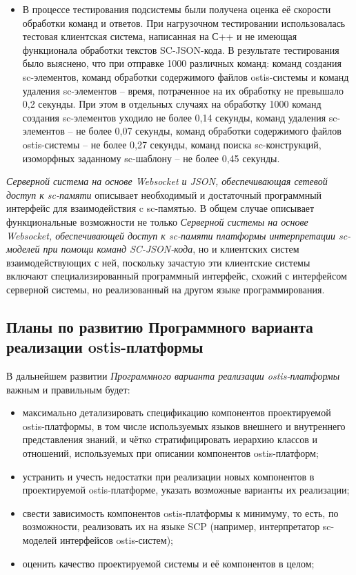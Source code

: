 \begin{itemize}
    \item В процессе тестирования подсистемы были получена оценка её скорости обработки команд и ответов. При нагрузочном тестировании использовалась тестовая клиентская система, написанная на С++ и не имеющая функционала обработки текстов SC-JSON-кода. В результате тестирования было выяснено, что при отправке 1000 различных команд: команд создания sc-элементов, команд обработки содержимого файлов ostis-системы и команд удаления sc-элементов -- время, потраченное на их обработку не превышало 0,2 секунды. При этом в отдельных случаях на обработку 1000 команд создания sc-элементов уходило не более 0,14 секунды, команд удаления sc-элементов -- не более 0,07 секунды, команд обработки содержимого файлов ostis-системы -- не более 0,27 секунды, команд поиска sc-конструкций, изоморфных заданному sc-шаблону -- не более 0,45 секунды.
\end{itemize}

\textit{Серверной система на основе Websocket и JSON, обеспечивающая сетевой доступ к sc-памяти} описывает необходимый и достаточный программный интерфейс для взаимодействия c sc-памятью. В общем случае описывает функциональные возможности не только \textit{Серверной системы на основе Websocket, обеспечивающей доступ к sc-памяти платформы интерпретации sc-моделей при помощи команд SC-JSON-кода}, но и клиентских систем взаимодействующих с ней, поскольку зачастую эти клиентские системы включают специализированный программный интерфейс, схожий с интерфейсом серверной системы, но реализованный на другом языке программирования.

\subsection{Планы по развитию Программного варианта реализации ostis-платформы}

В дальнейшем развитии \textit{Программного варианта реализации ostis-платформы} важным и правильным будет:
\begin{itemize}
    \item максимально детализировать спецификацию компонентов проектируемой ostis-платформы, в том числе используемых языков внешнего и внутреннего представления знаний, и чётко стратифицировать иерархию классов и отношений, используемых при описании компонентов ostis-платформ;
    \item устранить и учесть недостатки при реализации новых компонентов в проектируемой ostis-платформе, указать возможные варианты их реализации;
    \item свести зависимость компонентов ostis-платформы к минимуму, то есть, по возможности, реализовать их на языке SCP (например, интерпретатор sc-моделей интерфейсов ostis-систем);
    \item оценить качество проектируемой системы и её компонентов в целом;
\end{itemize}

